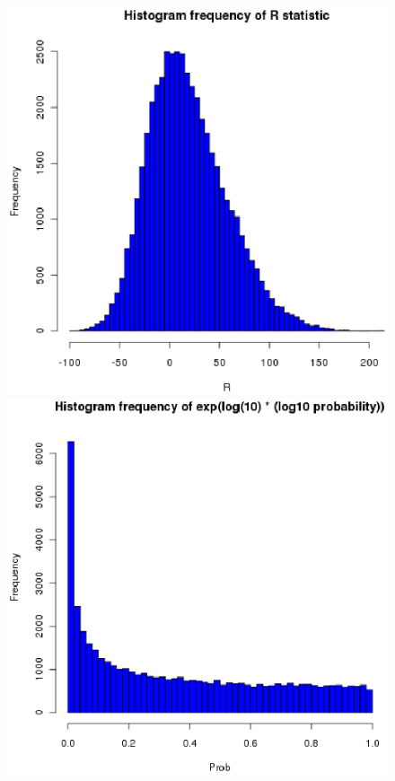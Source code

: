 \begin{figure}
\begin{center}
\includegraphics[width=0.6\paperwidth,height=0.35\paperheight]{StatHistRH1.eps}
\includegraphics[width=0.6\paperwidth,height=0.35\paperheight]{StatHistProbH1.eps}

\end{center}
\end{figure}

